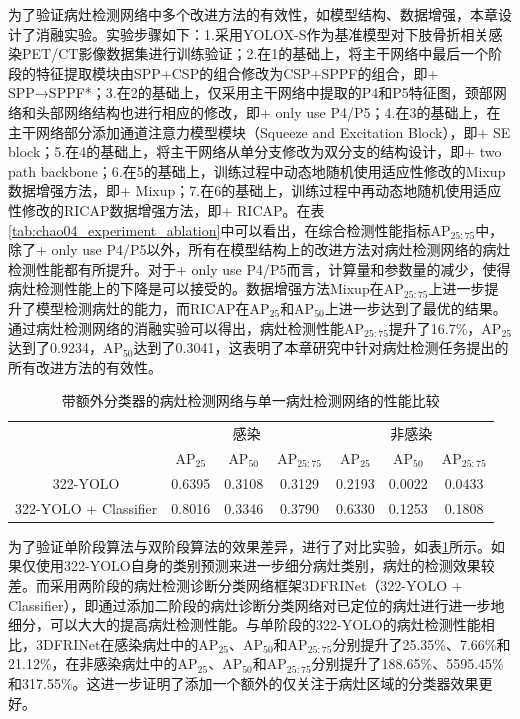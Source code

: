 为了验证病灶检测网络中多个改进方法的有效性，如模型结构、数据增强，本章设计了消融实验。实验步骤如下：1.采用YOLOX-S作为基准模型对下肢骨折相关感染PET/CT影像数据集进行训练验证；2.在1的基础上，将主干网络中最后一个阶段的特征提取模块由SPP+CSP的组合修改为CSP+SPPF的组合，即+ SPP→SPPF*；3.在2的基础上，仅采用主干网络中提取的P4和P5特征图，颈部网络和头部网络结构也进行相应的修改，即+ only use P4/P5；4.在3的基础上，在主干网络部分添加通道注意力模型模块（Squeeze and Excitation Block），即+ SE block；5.在4的基础上，将主干网络从单分支修改为双分支的结构设计，即+ two path backbone；6.在5的基础上，训练过程中动态地随机使用适应性修改的Mixup数据增强方法，即+ Mixup；7.在6的基础上，训练过程中再动态地随机使用适应性修改的RICAP数据增强方法，即+ RICAP。在表\ref{tab:chao04_experiment_ablation}中可以看出，在综合检测性能指标AP\(_{25:75}\)中，除了+ only use P4/P5以外，所有在模型结构上的改进方法对病灶检测网络的病灶检测性能都有所提升。对于+ only use P4/P5而言，计算量和参数量的减少，使得病灶检测性能上的下降是可以接受的。数据增强方法Mixup在AP\(_{25:75}\)上进一步提升了模型检测病灶的能力，而RICAP在AP\(_{25}\)和AP\(_{50}\)上进一步达到了最优的结果。通过病灶检测网络的消融实验可以得出，病灶检测性能AP\(_{25:75}\)提升了16.7\%，AP\(_{25}\)达到了0.9234，AP\(_{50}\)达到了0.3041，这表明了本章研究中针对病灶检测任务提出的所有改进方法的有效性。

\begin{table}[htbp]
  \centering
  \caption{带额外分类器的病灶检测网络与单一病灶检测网络的性能比较}
  \begin{tabular}{ccccccc}
    \toprule
                          & \multicolumn{3}{c}{感染} & \multicolumn{3}{c}{非感染}                                                               \\
                          & AP\(_{25}\)              & AP\(_{50}\)                & AP\(_{25:75}\) & AP\(_{25}\) & AP\(_{50}\) & AP\(_{25:75}\) \\
    \midrule
    322-YOLO              & 0.6395                   & 0.3108                     & 0.3129         & 0.2193      & 0.0022      & 0.0433         \\
    322-YOLO + Classifier & 0.8016                   & 0.3346                     & 0.3790         & 0.6330      & 0.1253      & 0.1808         \\
    \bottomrule
  \end{tabular}
  \label{tab:chao04_experiment_1vs2}
\end{table}

为了验证单阶段算法与双阶段算法的效果差异，进行了对比实验，如表\ref{tab:chao04_experiment_1vs2}所示。如果仅使用322-YOLO自身的类别预测来进一步细分病灶类别，病灶的检测效果较差。而采用两阶段的病灶检测诊断分类网络框架3DFRINet（322-YOLO + Classifier），即通过添加二阶段的病灶诊断分类网络对已定位的病灶进行进一步地细分，可以大大的提高病灶检测性能。与单阶段的322-YOLO的病灶检测性能相比，3DFRINet在感染病灶中的AP\(_{25}\)、AP\(_{50}\)和AP\(_{25:75}\)分别提升了25.35\%、7.66\%和21.12\%，在非感染病灶中的AP\(_{25}\)、AP\(_{50}\)和AP\(_{25:75}\)分别提升了188.65\%、5595.45\%和317.55\%。这进一步证明了添加一个额外的仅关注于病灶区域的分类器效果更好。

